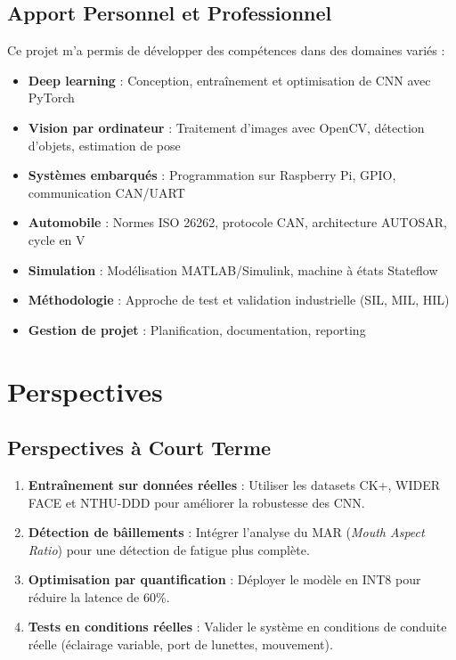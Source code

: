 \documentclass[12pt,a4paper,twoside]{report}
\begin{document}
\subsection{Apport Personnel et Professionnel}

Ce projet m'a permis de développer des compétences dans des domaines variés :

\begin{itemize}
    \item \textbf{Deep learning} : Conception, entraînement et optimisation de CNN avec PyTorch
    \item \textbf{Vision par ordinateur} : Traitement d'images avec OpenCV, détection d'objets, estimation de pose
    \item \textbf{Systèmes embarqués} : Programmation sur Raspberry Pi, GPIO, communication CAN/UART
    \item \textbf{Automobile} : Normes ISO 26262, protocole CAN, architecture AUTOSAR, cycle en V
    \item \textbf{Simulation} : Modélisation MATLAB/Simulink, machine à états Stateflow
    \item \textbf{Méthodologie} : Approche de test et validation industrielle (SIL, MIL, HIL)
    \item \textbf{Gestion de projet} : Planification, documentation, reporting
\end{itemize}

\section{Perspectives}

\subsection{Perspectives à Court Terme}

\begin{enumerate}[leftmargin=2cm]
    \item \textbf{Entraînement sur données réelles} : Utiliser les datasets CK+, WIDER FACE et NTHU-DDD pour améliorer la robustesse des CNN.
    \item \textbf{Détection de bâillements} : Intégrer l'analyse du MAR (\textit{Mouth Aspect Ratio}) pour une détection de fatigue plus complète.
    \item \textbf{Optimisation par quantification} : Déployer le modèle en INT8 pour réduire la latence de 60\%.
    \item \textbf{Tests en conditions réelles} : Valider le système en conditions de conduite réelle (éclairage variable, port de lunettes, mouvement).
\end{enumerate}
\end{document}
